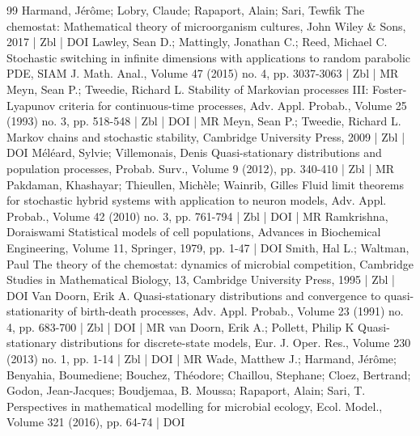 \documentclass[10pt]{amsart}
\theoremstyle{definition}\newtheorem{defi}[theo]{Definition}\newtheorem{rema}[theo]{Remark}\newtheorem{exam}[theo]{Example}\newtheorem{exem}[theo]{Example}\newtheorem{nota}[theo]{Notation}
\newcommand{\1}{\mathbf{1}}
\begin{document}
\begin{thebibliography}{99}
 Harmand, Jérôme; Lobry, Claude; Rapaport, Alain; Sari, Tewfik The chemostat: Mathematical theory of microorganism cultures, John Wiley \& Sons, 2017 | Zbl | DOI
 Lawley, Sean D.; Mattingly, Jonathan C.; Reed, Michael C. Stochastic switching in infinite dimensions with applications to random parabolic PDE, SIAM J. Math. Anal., Volume 47 (2015) no. 4, pp. 3037-3063 | Zbl | MR
 Meyn, Sean P.; Tweedie, Richard L. Stability of Markovian processes III: Foster-Lyapunov criteria for continuous-time processes, Adv. Appl. Probab., Volume 25 (1993) no. 3, pp. 518-548 | Zbl | DOI | MR
 Meyn, Sean P.; Tweedie, Richard L. Markov chains and stochastic stability, Cambridge University Press, 2009 | Zbl | DOI
 Méléard, Sylvie; Villemonais, Denis Quasi-stationary distributions and population processes, Probab. Surv., Volume 9 (2012), pp. 340-410 | Zbl | MR
 Pakdaman, Khashayar; Thieullen, Michèle; Wainrib, Gilles Fluid limit theorems for stochastic hybrid systems with application to neuron models, Adv. Appl. Probab., Volume 42 (2010) no. 3, pp. 761-794 | Zbl | DOI | MR
 Ramkrishna, Doraiswami Statistical models of cell populations, Advances in Biochemical Engineering, Volume 11, Springer, 1979, pp. 1-47 | DOI
 Smith, Hal L.; Waltman, Paul The theory of the chemostat: dynamics of microbial competition, Cambridge Studies in Mathematical Biology, 13, Cambridge University Press, 1995 | Zbl | DOI
 Van Doorn, Erik A. Quasi-stationary distributions and convergence to quasi-stationarity of birth-death processes, Adv. Appl. Probab., Volume 23 (1991) no. 4, pp. 683-700 | Zbl | DOI | MR
 van Doorn, Erik A.; Pollett, Philip K Quasi-stationary distributions for discrete-state models, Eur. J. Oper. Res., Volume 230 (2013) no. 1, pp. 1-14 | Zbl | DOI | MR
 Wade, Matthew J.; Harmand, Jérôme; Benyahia, Boumediene; Bouchez, Théodore; Chaillou, Stephane; Cloez, Bertrand; Godon, Jean-Jacques; Boudjemaa, B. Moussa; Rapaport, Alain; Sari, T. Perspectives in mathematical modelling for microbial ecology, Ecol. Model., Volume 321 (2016), pp. 64-74 | DOI
\end{thebibliography}
\end{document}
